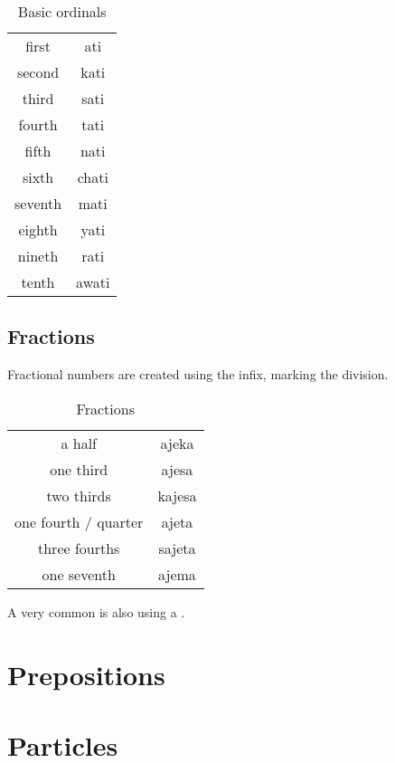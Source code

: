 \begin{table}[ht]
  \centering
  \caption{Basic ordinals}
  \begin{tabular}{cc} \toprule
    first   & ati   \\
    second  & kati  \\
    third   & sati  \\
    fourth  & tati  \\
    fifth   & nati  \\
    sixth   & chati \\
    seventh & mati  \\
    eighth  & yati  \\
    nineth  & rati  \\
    tenth   & awati \\\bottomrule
  \end{tabular}
  \label{tab:numerals3}
\end{table}

\subsection{Fractions}

Fractional numbers are created using the  infix, marking the division.


\begin{table}[ht]
  \centering
  \caption{Fractions}
  \begin{tabular}{cc} \toprule
    a half               & ajeka  \\
    one third            & ajesa  \\
    two thirds           & kajesa \\
    one fourth / quarter & ajeta  \\
    three fourths        & sajeta \\
    one seventh          & ajema  \\\bottomrule
  \end{tabular}
  \label{tab:numerals4}
\end{table}

A very common is also using a .


\section{Prepositions}

\section{Particles}